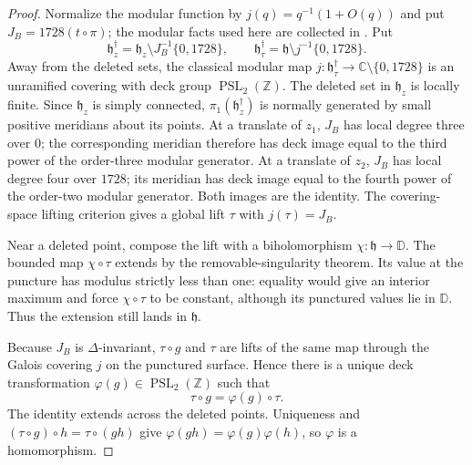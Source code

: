 \begin{proof}
Normalize the modular function by
\(j(q)=q^{-1}(1+O(q))\) and put
\(J_B=1728(t\circ\pi)\); the modular facts used here are collected in
\cite[Chapter~VII]{Serre1973}.  Put
\[
 \mathfrak h_z^\dagger=
 \mathfrak h_z\setminus J_B^{-1}\{0,1728\},\qquad
 \mathfrak h_\tau^\dagger=
 \mathfrak h\setminus j^{-1}\{0,1728\}.
\]
Away from the deleted sets, the classical modular map
\(j:\mathfrak h_\tau^\dagger\to\mathbb C\setminus\{0,1728\}\) is an
unramified covering with deck group
\(\operatorname{PSL}_2(\mathbb Z)\).  The deleted set in
\(\mathfrak h_z\) is locally finite.  Since \(\mathfrak h_z\) is simply
connected, \(\pi_1(\mathfrak h_z^\dagger)\) is normally generated by small
positive meridians about its points.  At a translate of \(z_1\), \(J_B\)
has local degree three over \(0\); the corresponding meridian therefore has
deck image equal to the third power of the order-three modular generator.
At a translate of \(z_2\), \(J_B\) has local degree four over \(1728\); its
meridian has deck image equal to the fourth power of the order-two modular
generator.  Both images are the identity.  The covering-space lifting
criterion gives a global lift \(\tau\) with \(j(\tau)=J_B\).

Near a deleted point, compose the lift with a biholomorphism
\(\chi:\mathfrak h\to\mathbb D\).  The bounded map \(\chi\circ\tau\)
extends by the removable-singularity theorem.  Its value at the puncture has
modulus strictly less than one: equality would give an interior maximum and
force \(\chi\circ\tau\) to be constant, although its punctured values lie in
 \(\mathbb D\).  Thus the extension still lands in \(\mathfrak h\).

Because \(J_B\) is \(\Delta\)-invariant, \(\tau\circ g\) and \(\tau\) are
lifts of the same map through the Galois covering \(j\) on the punctured
surface.  Hence there is a unique deck transformation
\(\varphi(g)\in\operatorname{PSL}_2(\mathbb Z)\) such that
\begin{equation}
 \tau\circ g=\varphi(g)\circ\tau.
\label{eq:period-deck-homomorphism}
\end{equation}
The identity extends across the deleted points.  Uniqueness and
\((\tau\circ g)\circ h=\tau\circ(gh)\) give
\(\varphi(gh)=\varphi(g)\varphi(h)\), so \(\varphi\) is a homomorphism.


\end{proof}
